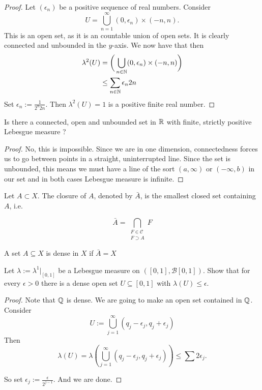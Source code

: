\begin{proof}
Let \((\epsilon_{n})\) be a positive sequence of real numbers. Consider
\[
U=\bigcup _{n=1}^\infty  (0,\epsilon_{n})\times(-n,n).
\]
This is an open set, as it is an countable union of open sets. It is clearly connected and unbounded in the \(y\)-axis. We now have that
then \begin{align*}
\lambda ^2(U)&=\bigg(\bigcup _{n\in \Bbb{N}}(0,\epsilon_{n})\times(-n,n) \bigg)\\
&\leq \sum _{n\in \Bbb{N}}\epsilon_{n}2n
\end{align*}
Set \(\epsilon_{n}:=\frac{1}{2^n2n}.\) Then \(\lambda ^2(U)=1\) is a positive finite real number.
\end{proof}

\begin{thm}
Is there a connected, open and unbounded set in \(\Bbb{R}\) with finite, strictly positive Lebesgue measure ?
\end{thm}


\begin{proof}
No, this is impossible. Since we are in one dimension, connectedness forces us to go between points in a straight, uninterrupted line. Since the set is unbounded, this means we must have a line of the sort \((a,\infty )\) or \((-\infty ,b)\) in our set and in both cases Lebesgue measure is infinite.
\end{proof}

\begin{defn}
Let \(A \subset  X\). The closure of \(A\), denoted by \(\bar{A}\), is the smallest closed set
containing \(A\), i.e.

\[
\bar{A}=\bigcap_{\substack{F\in \mathcal{C}\\F\supset A}} F
\]

\end{defn}

\begin{defn}
A set \(A\subseteq X\) is dense in \(X\) if \(\bar{A}=X\)
\end{defn}

\begin{thm}[Problem 6.7]
Let \(\lambda :=\lambda ^1|_{[0,1]}\) be a Lebesgue measure on \(([0,1], \mathcal{B}[0,1])\). Show that for every \(\epsilon>0\) there is a dense open set \(U\subseteq [0,1]\) with \(\lambda (U)\leq \epsilon\).
\end{thm}

\begin{proof}
Note that \(\Bbb{Q}\) is dense. We are going to make an open set contained in \(\Bbb{Q}\).
Consider
\[
U:=\bigcup _{j=1}^\infty (q_{j}-\epsilon_{j},q_{j}+\epsilon_{j})
\]
Then
\[
\lambda (U)=\lambda (\bigcup _{j=1}^\infty (q_{j}-\epsilon_{j},q_{j}+\epsilon_{j}))\leq \sum 2\epsilon_{j}.
\]

So set \(\epsilon_{j}:=\frac{\epsilon}{2^{j-1}}\). And we are done.
\end{proof}

